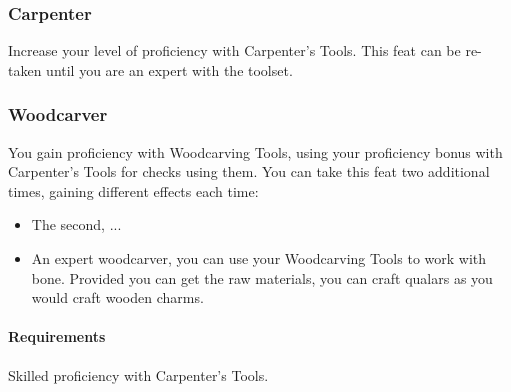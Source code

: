 \subsubsection{Carpenter} \label{feat::carpenter}
    Increase your level of proficiency with Carpenter's Tools.
    This feat can be re-taken until you are an expert with the toolset.
\subsubsection{Woodcarver} \label{feat::woodcarver}
    You gain proficiency with Woodcarving Tools, using your proficiency bonus with Carpenter's Tools for checks using them.
    You can take this feat two additional times, gaining different effects each time:
    \begin{itemize}
        \item The second, ...
        \item An expert woodcarver, you can use your Woodcarving Tools to work with bone.
        Provided you can get the raw materials, you can craft qualars as you would craft wooden charms.
    \end{itemize}
    \paragraph{Requirements} Skilled proficiency with Carpenter's Tools.

